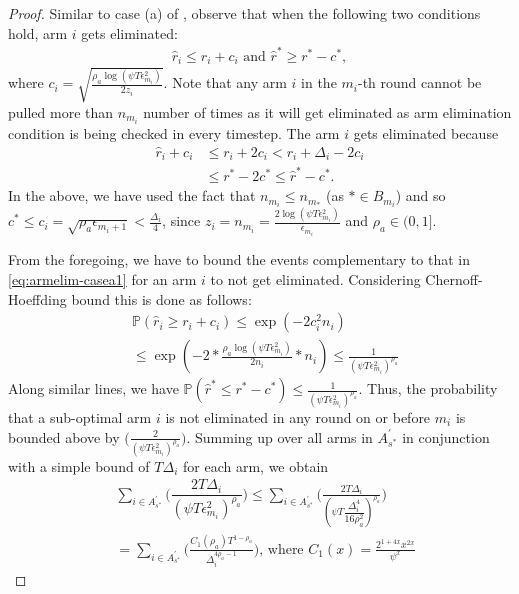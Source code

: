 \begin{proof}
Similar to case (a) of \citet{auer2010ucb}, observe that when the following two conditions hold, arm $i$ gets eliminated:
\begin{align}
\hat{r}_{i}  \le r_{i} + c_{i} \text{ and } 
 \hat{r}^{*}\geq  r^{*} - c^{*}, \label{eq:armelim-casea1}
\end{align}
where  $c_i = \sqrt{\frac{\rho_{a}\log (\psi T\epsilon_{m_{i}}^{2})}{2 z_{i}}}$. Note that any arm $i$ in the $m_{i}$-th round cannot be pulled more than $n_{m_{i}}$ number of times as it will get eliminated as arm elimination condition is being checked in every timestep. The arm $i$ gets eliminated because 
  \begin{align*}
\hat{r}_{i} +c_i & \leq r_{i} + 2c_{i} < r_{i} + \Delta_{i} - 2c_{i}\\
 &\leq r^{*} -2c^{*} \leq \hat{r}^{*} - c^{*}  .
  \end{align*}
In the above, we have used the fact that $n_{m_i} \leq n_{m_*}$ (as $*\in B_{m_i}$) and so \\ $c^{*} \leq c_i = \sqrt{\rho_{a}\epsilon_{m_{i}+1}} < \frac{\Delta_{i}}{4}$, since $z_i = n_{m_{i}}=\frac{2\log{(\psi T\epsilon_{m_{i}}^{2})}}{\epsilon_{m_{i}}}$ and $\rho_{a}\in (0,1]$.

From the foregoing, we have to bound the events complementary to that in \eqref{eq:armelim-casea1} for an arm $i$ to not get eliminated. Considering Chernoff-Hoeffding bound this is done as follows:
  \begin{align*}
&\mathbb{P}\left(\hat{r}_{i}\geq r_{i} + c_{i}\right)\leq \exp(-2c_{i}^{2}n_{i})\\
&\leq \exp(-2 * \frac{\rho_{a}\log (\psi T\epsilon_{m_{i}}^{2})}{2 n_{i}} *n_{i})
\leq \frac{1}{(\psi T\epsilon_{m_{i}}^{2})^{\rho_{a}}}   
  \end{align*}
Along similar lines, we have 
$\mathbb{P}\left(\hat{r}^{*}\leq r^{*} - c^{*}\right)\leq \frac{1}{(\psi  T\epsilon_{m_{i}}^{2})^{\rho_{a}}}.$ Thus, the probability that a sub-optimal arm ${i}$ is not eliminated in any round on or before $m_{i}$ is bounded above by  $\bigg(\frac{2}{(\psi T\epsilon_{m_{i}}^{2})^{\rho_{a}}}\bigg)$. 
 Summing up over all arms in $A_{s^{*}}^{'}$ in conjunction with a simple bound of $T\Delta_{i}$ for each arm, we obtain
   \begin{align*}
&\sum_{i\in A_{s^{*}}^{'}}\bigg(\dfrac{2T\Delta_{i}}{(\psi T\epsilon_{m_{i}}^{2})^{\rho_{a}}}\bigg)
\leq\sum_{i\in A_{s^{*}}^{'}}\bigg(\frac{2T\Delta_{i}}{(\psi T\dfrac{\Delta_{i}^{4}}{16\rho_{a}^{2}})^{\rho_{a}}}\bigg)\\
& =\sum_{i\in A_{s^{*}}^{'}}\bigg(\frac{C_{1}(\rho_{a})T^{1-\rho_{a}}}{\Delta_{i}^{4\rho_{a}-1}}\bigg) \text{, where } C_1(x) = \frac{2^{1+4x}x^{2x}}{\psi^{x}}
   \end{align*}


\end{proof}
